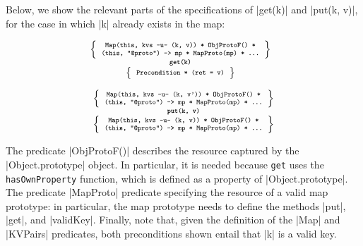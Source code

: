 Below, we show the relevant parts of the specifications of \jsinline|get(k)| and \jsinline|put(k, v)|, for the case in which
 \jsinline|k| already exists in the map:

\noindent
\begin{minipage}{0.475\textwidth}
\begin{displaymath} 
{\scriptsize
\hspace*{-0.2cm}
\begin{array}{c}
\left\{ {\begin{array}{c}
 \text{\texttt{Map(this, kvs -u- (k, v)) * ObjProtoF() *}} \\
 \text{\texttt{(this, "@proto") -> mp * MapProto(mp) * ...}}
\end{array}} \right\} \\
%
\text{\bfseries \texttt{get(k)}} \\[0.2mm]
%
\left\{ {\begin{array}{c}
 \text{\texttt{Precondition * (ret = v)}} 
\end{array}} \right\}
\end{array}
} 
\end{displaymath}
\end{minipage}
\quad
\begin{minipage}{0.48\textwidth}
%
\begin{displaymath} 
{\scriptsize
\begin{array}{c}
\left\{ {\begin{array}{c}
 \text{\texttt{Map(this, kvs -u- (k, v')) * ObjProtoF() *}} \\
 \text{\texttt{(this, "@proto") -> mp * MapProto(mp) * ...}}
\end{array}} \right\} \\
%
\text{\bfseries \texttt{put(k, v)}} \\[0.2mm]
%
\left\{ {\begin{array}{c}
 \text{\texttt{Map(this, kvs -u- (k, v)) * ObjProtoF() *}} \\
 \text{\texttt{(this, "@proto") -> mp * MapProto(mp) * ...}}
\end{array}} \right\}
\end{array}
} 
\end{displaymath}
\end{minipage}

\vspace{10pt}
The predicate \jsinline|ObjProtoF()| describes the resource captured by the \jsinline|Object.prototype| object. 
In particular, it is needed because \texttt{get} uses the \texttt{hasOwnProperty} function, which is defined as a property of \jsinline|Object.prototype|. 
The predicate \jsinline|MapProto| predicate specifying the resource of a valid map prototype: in particular, the map prototype needs to define the methods \jsinline|put|, \jsinline|get|, and \jsinline|validKey|. Finally, note that, given the definition of the \jsinline|Map| and \jsinline|KVPairs| predicates, both preconditions shown entail that \jsinline|k| is a valid key.

